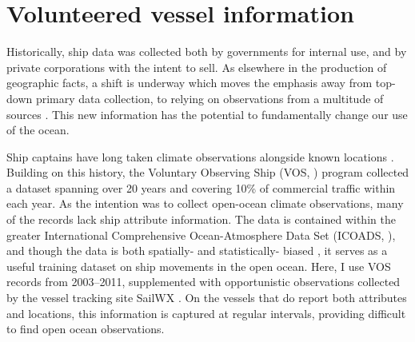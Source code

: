 

\section{Volunteered vessel information}


Historically, ship data was collected both by governments for internal use, and by private corporations with the intent to sell. As elsewhere in the production of geographic facts, a shift is underway which moves the emphasis away from top-down primary data collection, to relying on observations from a multitude of sources \citep{goodchild2007citizens,elwood2011researching}. This new information has the potential to fundamentally change our use of the ocean.

Ship captains have long taken climate observations alongside known locations \citep{brohan2009marine}.  Building on this history, the Voluntary Observing Ship (VOS, \citealp{VOSOverview}) program collected a dataset spanning over 20 years and covering 10\% of commercial traffic within each year. As the intention was to collect open-ocean climate observations, many of the records lack ship attribute information. %
The data is contained within the greater International Comprehensive Ocean-Atmosphere Data Set (ICOADS, \citealp{woodruff2010icoads}), and though the data is both spatially- and statistically- biased \citep{Wang2007}, it serves as a useful training dataset on ship movements in the open ocean. Here, I use VOS records from 2003--2011, supplemented with opportunistic observations collected by the vessel tracking site SailWX \citep{SAILWX}. On the vessels that do report both attributes and locations, this information is captured at regular intervals, providing difficult to find open ocean observations.

